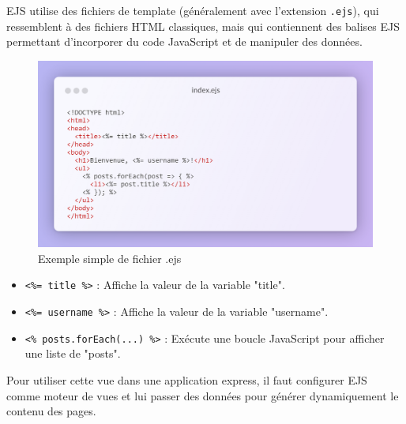 \vspace{0.35cm}

EJS utilise des fichiers de template (généralement avec l'extension \verb|.ejs|), qui ressemblent à des fichiers HTML classiques, mais qui contiennent des balises EJS permettant d'incorporer du code JavaScript et de manipuler des données.

\vspace{0.35cm}

\begin{figure}[H]
\begin{center}
\includegraphics[width=15cm]{assets/presentation/ejs-snippet.png}
\end{center}
\caption{Exemple simple de fichier .ejs}
\end{figure}

\vspace{0.35cm}

\begin{itemize}
    \item \verb|<%= title %>| : Affiche la valeur de la variable "title".
    \item \verb|<%= username %>| : Affiche la valeur de la variable "username".
    \item \verb|<% posts.forEach(...) %>| : Exécute une boucle JavaScript pour afficher une liste de "posts".
\end{itemize}

\vspace{0.35cm}

Pour utiliser cette vue dans une application express, il faut configurer EJS comme moteur de vues et lui passer des données pour générer dynamiquement le contenu des pages.

\newpage

